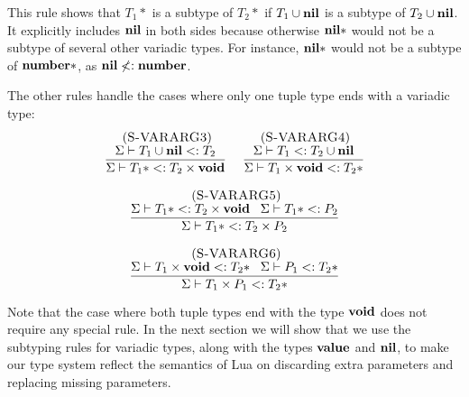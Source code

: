 This rule shows that $T_{1}{*}$ is a subtype of $T_{2}{*}$
if $T_{1} \cup \mathbf{nil}$ is a subtype of $T_{2} \cup \mathbf{nil}$.
It explicitly includes $\mathbf{nil}$ in both sides because otherwise
$\mathbf{nil}{*}$ would not be a subtype of several other variadic types.
For instance, $\mathbf{nil}{*}$ would not be a subtype of $\mathbf{number}{*}$,
as $\mathbf{nil} \not<: \mathbf{number}$.

The other rules handle the cases where only one tuple type ends with a variadic type:
\[
\begin{array}{c}
\begin{array}{c}
\; (\textsc{S-VARARG3})\\
\dfrac{\Sigma \vdash T_{1} \cup \mathbf{nil} <: T_{2}}
      {\Sigma \vdash T_{1}{*} <: T_{2} \times \mathbf{void}}
\end{array}
\;
\begin{array}{c}
\; (\textsc{S-VARARG4})\\
\dfrac{\Sigma \vdash T_{1} <: T_{2} \cup \mathbf{nil}}
      {\Sigma \vdash T_{1} \times \mathbf{void} <: T_{2}{*}}
\end{array}
\\ \\
\begin{array}{c}
\; (\textsc{S-VARARG5})\\
\dfrac{\Sigma \vdash T_{1}{*} <: T_{2} \times \mathbf{void} \;\;\;
       \Sigma \vdash T_{1}{*} <: P_{2}}
      {\Sigma \vdash T_{1}{*} <: T_{2} \times P_{2}}
\end{array}
\\ \\
\begin{array}{c}
\; (\textsc{S-VARARG6})\\
\dfrac{\Sigma \vdash T_{1} \times \mathbf{void} <: T_{2}{*} \;\;\;
       \Sigma \vdash P_{1} <: T_{2}{*}}
      {\Sigma \vdash T_{1} \times P_{1} <: T_{2}{*}}
\end{array}
\end{array}
\]

Note that the case where both tuple types end with the type $\mathbf{void}$ does
not require any special rule.
In the next section we will show that we use the subtyping rules for variadic types,
along with the types $\mathbf{value}$ and $\mathbf{nil}$, to make our type system reflect
the semantics of Lua on discarding extra parameters and
replacing missing parameters.

